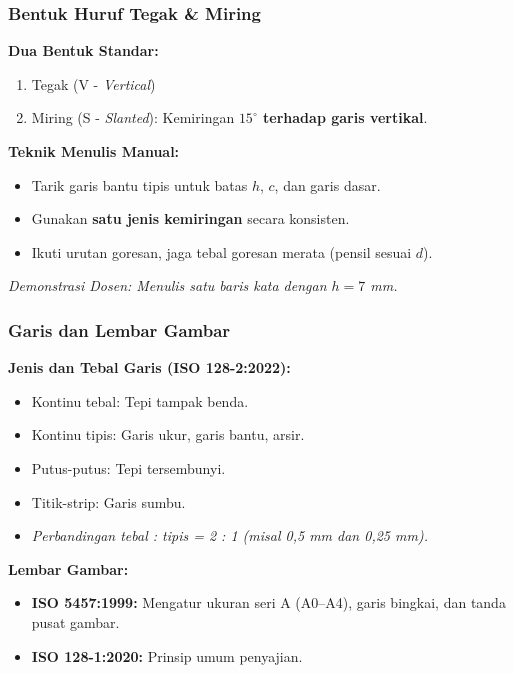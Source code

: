 \documentclass[../gbr_teknik.tex]{subfiles}
\begin{document}
\begin{frame}[mytitle=standard]
	\frametitle{Bentuk Huruf Tegak \& Miring}

	\textbf{Dua Bentuk Standar:}
	\begin{enumerate}
		\item Tegak (V - \textit{Vertical})
		\item Miring (S - \textit{Slanted}): Kemiringan \textbf{$15^\circ$ terhadap garis vertikal}.
	\end{enumerate}

	\textbf{Teknik Menulis Manual:}
	\begin{itemize}
		\item Tarik garis bantu tipis untuk batas $h$, $c$, dan garis dasar.
		\item Gunakan \textbf{satu jenis kemiringan} secara konsisten.
		\item Ikuti urutan goresan, jaga tebal goresan merata (pensil sesuai $d$).
	\end{itemize}

	\vspace{0.5em}
	\textit{Demonstrasi Dosen: Menulis satu baris kata dengan $h = 7$ mm.}
\end{frame}

\begin{frame}[mytitle=standard]
	\frametitle{Garis dan Lembar Gambar}

	\textbf{Jenis dan Tebal Garis (ISO 128-2:2022):}
	\begin{itemize}
		\item Kontinu tebal: Tepi tampak benda.
		\item Kontinu tipis: Garis ukur, garis bantu, arsir.
		\item Putus-putus: Tepi tersembunyi.
		\item Titik-strip: Garis sumbu.
		\item \textit{Perbandingan tebal : tipis = 2 : 1 (misal 0,5 mm dan 0,25 mm).}
	\end{itemize}

	\textbf{Lembar Gambar:}
	\begin{itemize}
		\item \textbf{ISO 5457:1999:} Mengatur ukuran seri A (A0--A4), garis bingkai, dan tanda pusat gambar.
		\item \textbf{ISO 128-1:2020:} Prinsip umum penyajian.
	\end{itemize}
\end{frame}
\end{document}
